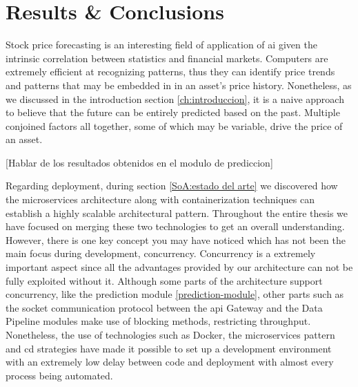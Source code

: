 \chapter{Results \& Conclusions}
\label{res:resultados}

Stock price forecasting is an interesting field of application of \gls{ai} given the intrinsic correlation between statistics and financial markets. Computers are extremely efficient at recognizing patterns, thus they can identify price trends and patterns that may be embedded in in an asset's price history. Nonetheless, as we discussed in the introduction section \ref{ch:introduccion}, it is a naive approach to believe that the future can be entirely predicted based on the past. Multiple conjoined factors all together, some of which may be variable, drive the price of an asset.


[Hablar de los resultados obtenidos en el modulo de prediccion]

Regarding deployment, during section \ref{SoA:estado del arte} we discovered how the microservices architecture along with containerization techniques can establish a highly scalable architectural pattern. Throughout the entire thesis we have focused on merging these two technologies to get an overall understanding. However, there is one key concept you may have noticed which has not been the main focus during development, concurrency. Concurrency is a extremely important aspect since all the advantages provided by our architecture can not be fully exploited without it. Although some parts of the architecture support concurrency, like the prediction module \ref{prediction-module}, other parts such as the socket communication protocol between the \gls{api} Gateway and the Data Pipeline modules make use of blocking methods, restricting throughput. Nonetheless, the use of technologies such as Docker, the microservices pattern and \gls{cd} strategies have made it possible to set up a development environment with an extremely low delay between code and deployment with almost every process being automated.
